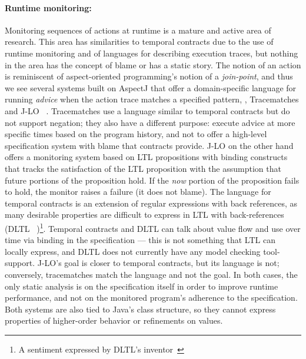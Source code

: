 \paragraph{Runtime monitoring:}
Monitoring sequences of actions at runtime is a mature and active area of research.
%
This area has similarities to temporal contracts due to the use of runtime monitoring and of languages for describing execution traces, but nothing in the area has the concept of blame or has a static story.
%
The notion of an action is reminiscent of aspect-oriented programming's notion of a \emph{join-point}, and thus we see several systems built on AspectJ \citep{ianjohnson:aspectj} that offer a domain-specific language for running \emph{advice} when the action trace matches a specified pattern, \eg, Tracematches \citep{ianjohnson:Allan05addingtrace} and J-LO ~\citep{ianjohnson:jlo}.
%
Tracematches use a language similar to temporal contracts but do not support negation; they also have a different purpose: execute advice at more specific times based on the program history, and not to offer a high-level specification system with blame that contracts provide.
%
J-LO on the other hand offers a monitoring system based on LTL propositions with binding constructs that tracks the satisfaction of the LTL proposition with the assumption that future portions of the proposition hold.
%
If the \emph{now} portion of the proposition fails to hold, the monitor raises a failure (it does not blame).
%
The language for temporal contracts is an extension of regular expressions with back references, as many desirable properties are difficult to express in LTL with back-references (DLTL ~\cite{ianjohnson:jlo})\footnote{A sentiment expressed by DLTL's inventor~\citep{boddenadmission}}.
%
Temporal contracts and DLTL can talk about value flow and use over time via binding in the specification --- this is not something that LTL can locally express, and DLTL does not currently have any model checking tool-support.
%
J-LO's goal is closer to temporal contracts, but its language is not; conversely, tracematches match the language and not the goal.
%
In both cases, the only static analysis is on the specification itself in order to improve runtime performance, and not on the monitored program's adherence to the specification.
%
Both systems are also tied to Java's class structure, so they cannot express properties of higher-order behavior or refinements on values.


